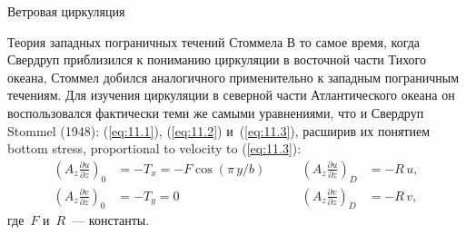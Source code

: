 \begin{chapter}{Ветровая циркуляция}
\begin{section}{Теория западных пограничных течений Стоммела}
%
В то самое время, когда Свердруп приблизился к пониманию циркуляции в восточной
части Тихого океана, Стоммел добился аналогичного применительно к западным
пограничным течениям. Для изучения циркуляции в северной части Атлантического
океана он воспользовался фактически теми же самыми 
уравнениями, что и Свердруп Stommel (1948): (\ref{eq:11.1}), (\ref{eq:11.2}) 
и~(\ref{eq:11.3}), расширив их понятием bottom stress, 
proportional to velocity to (\ref{eq:11.3}):
\begin{subequations}
\begin{alignat}{2}
\left(A_z \frac{\partial{u}}{\partial{z}}\right)_0 &= -T_x =-F\cos(\pi \,y/b)& \qquad \left(A_z \frac{\partial{u}}{\partial{z}}\right)_D &= -R\,u, \\
\left(A_z \frac{\partial{v}}{\partial{z}}\right)_0 &= -T_y =0 & \qquad \left(A_z \frac{\partial{v}}{\partial{z}}\right)_D &= -R\,v,
\end{alignat}
\end{subequations}
где~$F$ и~$R$~--- константы.
%


\end{section}
\end{chapter}
